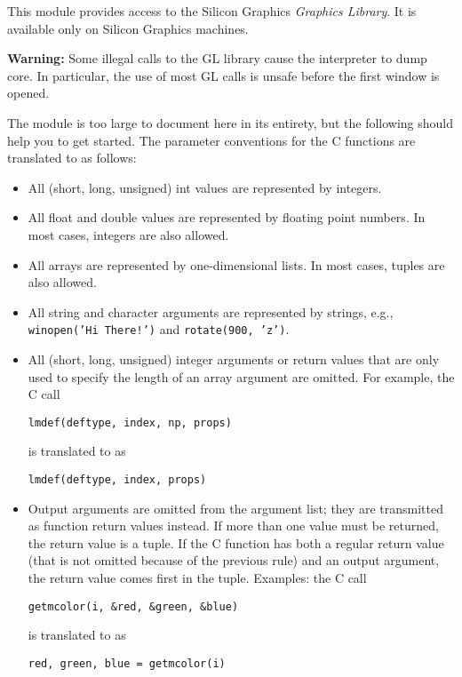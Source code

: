 This module provides access to the Silicon Graphics
{\em Graphics Library}.
It is available only on Silicon Graphics machines.

{\bf Warning:}
Some illegal calls to the GL library cause the {\Python} interpreter to dump
core.
In particular, the use of most GL calls is unsafe before the first
window is opened.

The module is too large to document here in its entirety, but the
following should help you to get started.
The parameter conventions for the C functions are translated to {\Python} as
follows:

\begin{itemize}
\item
All (short, long, unsigned) int values are represented by {\Python}
integers.
\item
All float and double values are represented by {\Python} floating point
numbers.
In most cases, {\Python} integers are also allowed.
\item
All arrays are represented by one-dimensional {\Python} lists.
In most cases, tuples are also allowed.
\item
All string and character arguments are represented by {\Python} strings,
e.g.,
{\tt winopen('Hi~There!')}
and
{\tt rotate(900,~'z')}.
\item
All (short, long, unsigned) integer arguments or return values that are
only used to specify the length of an array argument are omitted.
For example, the C call
\begin{code}\begin{verbatim}
lmdef(deftype, index, np, props)
\end{verbatim}\end{code}
is translated to {\Python} as
\begin{code}\begin{verbatim}
lmdef(deftype, index, props)
\end{verbatim}\end{code}
\item
Output arguments are omitted from the argument list; they are
transmitted as function return values instead.
If more than one value must be returned, the return value is a tuple.
If the C function has both a regular return value (that is not omitted
because of the previous rule) and an output argument, the return value
comes first in the tuple.
Examples: the C call
\begin{code}\begin{verbatim}
getmcolor(i, &red, &green, &blue)
\end{verbatim}\end{code}
is translated to {\Python} as
\begin{code}\begin{verbatim}
red, green, blue = getmcolor(i)
\end{verbatim}\end{code}
\end{itemize}

